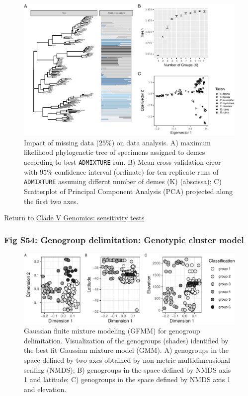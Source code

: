 \documentclass[
  11pt,
]{article}
\begin{document}
\begin{figure}
\includegraphics{Supplementary_Material_files/figure-latex/cladeVgenomicSensitivityAnalysesSmallestplots-1} \caption{Impact of missing data ($25\%$) on data analysis. A) maximum likelihood phylogenetic tree of specimens assigned to demes according to best \texttt{ADMIXTURE} run. B) Mean cross validation error with $95\%$ confidence interval (ordinate) for ten replicate runs of \texttt{ADMIXTURE} assuming differnt number of demes (K) (abscissa); C) Scatterplot of Principal Component Analysis (PCA) projected along the first two axes.}\label{fig:cladeVgenomicSensitivityAnalysesSmallestplots}
\end{figure}

Return to \protect\hyperlink{sensitivity-tests-4}{Clade V Genomics: sensitivity tests}
\pagebreak

\hypertarget{fig-s54-genogroup-delimitation-genotypic-cluster-model}{%
\subsubsection{Fig S54: Genogroup delimitation: Genotypic cluster model}\label{fig-s54-genogroup-delimitation-genotypic-cluster-model}}

\begin{figure}
\includegraphics{Supplementary_Material_files/figure-latex/cladeVmolecularDelimitationsNmms-1} \caption{Gaussian finite mixture modeling (GFMM) for genogroup delimitation. Visualization of the genogroups (shades) identified by the best fit Gaussian mixture model (GMM). A) genogroups in the space defined by two axes obtained by non-metric multidimensional scaling (NMDS); B) genogroups in the space defined by NMDS axis 1 and latitude; C) genogroups in the space defined by NMDS axis 1 and elevation.}\label{fig:cladeVmolecularDelimitationsNmms}
\end{figure}
\end{document}
